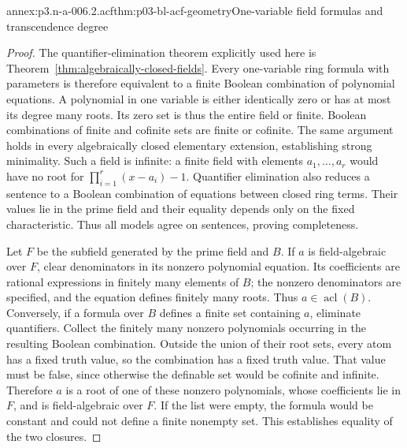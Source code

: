 \begin{annexitem}{annex:p3.n-a-006.2.acf}{thm:p03-bl-acf-geometry}{One-variable field formulas and transcendence degree}
\begin{proof}
The quantifier-elimination theorem explicitly used here is
Theorem~\ref{thm:algebraically-closed-fields}. Every one-variable ring formula with
parameters is therefore equivalent to a finite Boolean combination
of polynomial equations. A polynomial in one variable is either
identically zero or has at most its degree many roots. Its zero set
is thus the entire field or finite. Boolean combinations of finite
and cofinite sets are finite or cofinite. The same argument holds
in every algebraically closed elementary extension, establishing
strong minimality. Such a field is infinite: a finite field with
elements \(a_1,\ldots,a_r\) would have no root for
\(\prod_{i=1}^r(x-a_i)-1\). Quantifier elimination also reduces a
sentence to a Boolean combination of equations between closed ring
terms. Their values lie in the prime field and their equality
depends only on the fixed characteristic. Thus all models agree on
sentences, proving completeness.

Let \(F\) be the subfield generated by the prime field and \(B\).
If \(a\) is field-algebraic over \(F\), clear denominators in its
nonzero polynomial equation. Its coefficients are rational
expressions in finitely many elements of \(B\); the nonzero
denominators are specified, and the equation defines finitely many
roots. Thus \(a\in\operatorname{acl}(B)\). Conversely, if a
formula over \(B\) defines a finite set containing \(a\), eliminate
quantifiers. Collect the finitely many nonzero polynomials occurring
in the resulting Boolean combination. Outside the union of their
root sets, every atom has a fixed truth value, so the combination
has a fixed truth value. That value must be false, since otherwise
the definable set would be cofinite and infinite. Therefore \(a\)
is a root of one of these nonzero polynomials, whose coefficients
lie in \(F\), and is field-algebraic over \(F\). If the list were
empty, the formula would be constant and could not define a finite
nonempty set. This establishes equality of the two closures.


\end{proof}
\end{annexitem}
